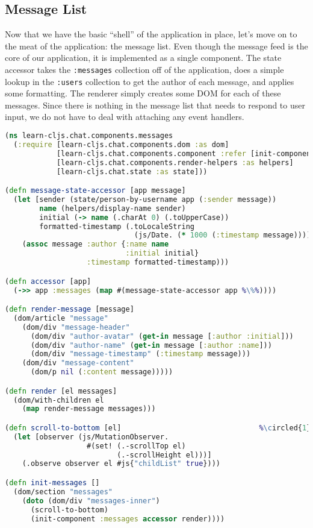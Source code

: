 \documentclass[10pt,twoside,openright]{memoir}
\newcommand*\circled[1]{\tikz[baseline=(char.base)]{
            \node[shape=circle,draw,inner sep=1pt] (char) {#1};}}
\begin{document}
\subsection{Message List}

Now that we have the basic ``shell'' of the application in place, let's
move on to the meat of the application: the message list. Even though
the message feed is the core of our application, it is implemented as a
single component. The state accessor takes the \texttt{:messages}
collection off of the application, does a simple lookup in the
\texttt{:users} collection to get the author of each message, and
applies some formatting. The renderer simply creates some DOM for each
of these messages. Since there is nothing in the message list that needs
to respond to user input, we do not have to deal with attaching any
event handlers.

\begin{lstlisting}[language=Clojure, caption={chat/components/messages.cljs}]
(ns learn-cljs.chat.components.messages
  (:require [learn-cljs.chat.components.dom :as dom]
            [learn-cljs.chat.components.component :refer [init-component]]
            [learn-cljs.chat.components.render-helpers :as helpers]
            [learn-cljs.chat.state :as state]))

(defn message-state-accessor [app message]
  (let [sender (state/person-by-username app (:sender message))
        name (helpers/display-name sender)
        initial (-> name (.charAt 0) (.toUpperCase))
        formatted-timestamp (.toLocaleString
                              (js/Date. (* 1000 (:timestamp message))))]
    (assoc message :author {:name name
                            :initial initial}
                   :timestamp formatted-timestamp)))

(defn accessor [app]
  (->> app :messages (map #(message-state-accessor app %\%%))))

(defn render-message [message]
  (dom/article "message"
    (dom/div "message-header"
      (dom/div "author-avatar" (get-in message [:author :initial]))
      (dom/div "author-name" (get-in message [:author :name]))
      (dom/div "message-timestamp" (:timestamp message)))
    (dom/div "message-content"
      (dom/p nil (:content message)))))

(defn render [el messages]
  (dom/with-children el
    (map render-message messages)))

(defn scroll-to-bottom [el]                                %\circled{1}%
  (let [observer (js/MutationObserver.
                   #(set! (.-scrollTop el)
                          (.-scrollHeight el)))]
    (.observe observer el #js{"childList" true})))

(defn init-messages []
  (dom/section "messages"
    (doto (dom/div "messages-inner")
      (scroll-to-bottom)
      (init-component :messages accessor render))))
\end{lstlisting}
\end{document}
